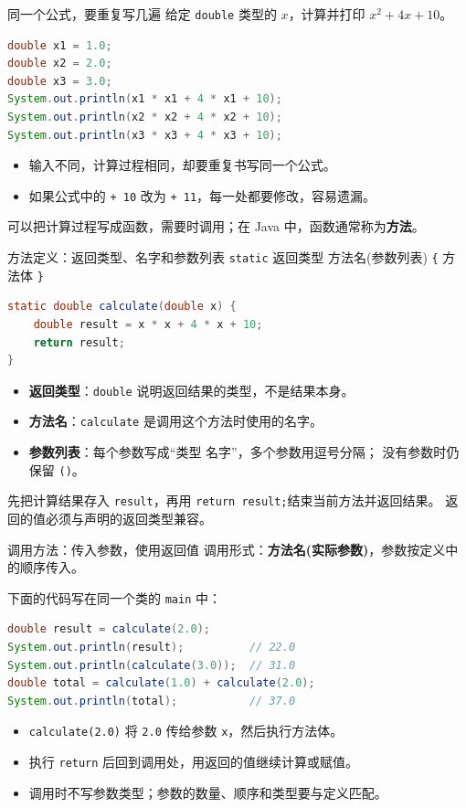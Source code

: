 \documentclass[aspectratio=169]{beamer}
\begin{document}
\begin{frame}[fragile]{同一个公式，要重复写几遍}
  给定 \texttt{double} 类型的 $x$，计算并打印 $x^2 + 4x + 10$。
  \begin{lstlisting}[language=Java]
double x1 = 1.0;
double x2 = 2.0;
double x3 = 3.0;
System.out.println(x1 * x1 + 4 * x1 + 10);
System.out.println(x2 * x2 + 4 * x2 + 10);
System.out.println(x3 * x3 + 4 * x3 + 10);
  \end{lstlisting}
  \begin{itemize}
    \item 输入不同，计算过程相同，却要重复书写同一个公式。
    \item 如果公式中的 \texttt{+ 10} 改为 \texttt{+ 11}，每一处都要修改，容易遗漏。
  \end{itemize}
  \medskip
  可以把计算过程写成\alert{函数}，需要时调用；在 Java 中，函数通常称为\textbf{方法}。
\end{frame}

\begin{frame}[fragile]{方法定义：返回类型、名字和参数列表}
  \texttt{static} 返回类型 方法名(参数列表) \texttt{\{} 方法体 \texttt{\}}
  \begin{lstlisting}[language=Java]
static double calculate(double x) {
    double result = x * x + 4 * x + 10;
    return result;
}
  \end{lstlisting}
  \begin{itemize}
    \item \textbf{返回类型}：\texttt{double} 说明返回结果的类型，不是结果本身。
    \item \textbf{方法名}：\texttt{calculate} 是调用这个方法时使用的名字。
    \item \textbf{参数列表}：每个参数写成“类型 名字”，多个参数用逗号分隔；
      没有参数时仍保留 \texttt{()}。
  \end{itemize}
  \medskip
  先把计算结果存入 \texttt{result}，再用 \texttt{return result;}\alert{结束当前方法并返回结果}。
  返回的值必须与声明的返回类型兼容。
\end{frame}

\begin{frame}[fragile]{调用方法：传入参数，使用返回值}
  调用形式：\textbf{方法名(实际参数)}，参数按定义中的顺序传入。
  \par\medskip
  下面的代码写在同一个类的 \texttt{main} 中：
  \begin{lstlisting}[language=Java]
double result = calculate(2.0);
System.out.println(result);          // 22.0
System.out.println(calculate(3.0));  // 31.0
double total = calculate(1.0) + calculate(2.0);
System.out.println(total);           // 37.0
  \end{lstlisting}
  \begin{itemize}
    \item \texttt{calculate(2.0)} 将 \texttt{2.0} 传给参数 \texttt{x}，然后执行方法体。
    \item 执行 \texttt{return} 后回到调用处，用返回的值继续计算或赋值。
    \item 调用时不写参数类型；参数的数量、顺序和类型要与定义匹配。
  \end{itemize}
\end{frame}
\end{document}
